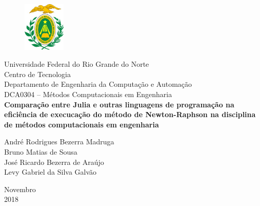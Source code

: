 \documentclass[a4paper, 12pt, openright, oneside]{article}
\begin{document}
\onehalfspacing
\begin{titlepage}
	\begin{center}
	
	\begin{figure}[!ht]
	\centering
	\includegraphics[width=2cm]{./ufrn.jpg}
	\end{figure}
		Universidade Federal do Rio Grande do Norte\\
		Centro de Tecnologia\\
		Departamento de Engenharia da Computação e Automação\\
		DCA0304 -- Métodos Computacionais em Engenharia\\
		\vspace{15pt}
        \vspace{95pt}
        \textbf{\large{Comparação entre Julia e outras linguagens de programação na eficiência de execucação do método de Newton-Raphson na disciplina de métodos computacionais em engenharia}}\\
		\vspace{3,5cm}
	\end{center}
	
	\begin{flushright}
			\item André Rodrigues Bezerra Madruga \\
			Bruno Matias de Sousa \\
			José Ricardo Bezerra de Araújo \\
			Levy Gabriel da Silva Galvão \\
 	\end{flushright}
	\vspace{1cm}
	
	\begin{center}
		\vspace{\fill}
		Novembro\\2018
	\end{center}
\end{titlepage}

\end{document}
